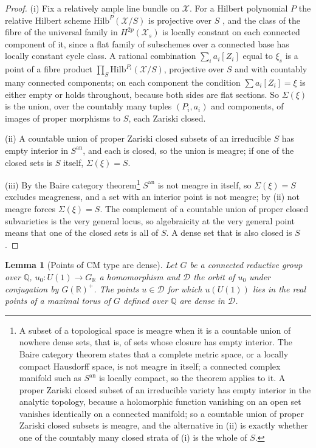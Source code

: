 \documentclass[11pt,reqno]{amsart}
\numberwithin{equation}{section}
\theoremstyle{plain}
\newtheorem{lemma}[theorem]{Lemma}
\theoremstyle{definition}
\newcommand{\QQ}{\mathbb{Q}}
\newcommand{\RR}{\mathbb{R}}
\newcommand{\cD}{\mathcal{D}}
\begin{document}
\begin{proof}
(i) Fix a relatively ample line bundle on $\mathcal{X}$. For a Hilbert polynomial $P$ the relative Hilbert scheme $\mathrm{Hilb}^{P}(\mathcal{X}/S)$ is projective over $S$ \cite{Gro61}, and the class of the fibre of the universal family in $H^{2p}(\mathcal{X}_{s})$ is locally constant on each connected component of it, since a flat family of subschemes over a connected base has locally constant cycle class. A rational combination $\sum_{i}a_{i}[Z_{i}]$ equal to $\xi_{s}$ is a point of a fibre product $\prod_{S}\mathrm{Hilb}^{P_{i}}(\mathcal{X}/S)$, projective over $S$ and with countably many connected components; on each component the condition $\sum a_{i}[Z_{i}]=\xi$ is either empty or holds throughout, because both sides are flat sections. So $\Sigma(\xi)$ is the union, over the countably many tuples $(P_{i},a_{i})$ and components, of images of proper morphisms to $S$, each Zariski closed.

(ii) A countable union of proper Zariski closed subsets of an irreducible $S$ has empty interior in $S^{\mathrm{an}}$, and each is closed, so the union is meagre; if one of the closed sets is $S$ itself, $\Sigma(\xi)=S$.

(iii) By the Baire category theorem\footnote{A subset of a topological space is meagre when it is a countable union of nowhere dense sets, that is, of sets whose closure has empty interior. The Baire category theorem states that a complete metric space, or a locally compact Hausdorff space, is not meagre in itself; a connected complex manifold such as $S^{\mathrm{an}}$ is locally compact, so the theorem applies to it. A proper Zariski closed subset of an irreducible variety has empty interior in the analytic topology, because a holomorphic function vanishing on an open set vanishes identically on a connected manifold; so a countable union of proper Zariski closed subsets is meagre, and the alternative in (ii) is exactly whether one of the countably many closed strata of (i) is the whole of $S$.} $S^{\mathrm{an}}$ is not meagre in itself, so $\Sigma(\xi)=S$ excludes meagreness, and a set with an interior point is not meagre; by (ii) not meagre forces $\Sigma(\xi)=S$. The complement of a countable union of proper closed subvarieties is the very general locus, so algebraicity at the very general point means that one of the closed sets is all of $S$. A dense set that is also closed is $S$.
\end{proof}

\begin{lemma}[Points of CM type are dense]\label{lem:cmdense}
Let $G$ be a connected reductive group over $\QQ$, $u_{0}\colon U(1)\to G_{\RR}$ a homomorphism and $\cD$ the orbit of $u_{0}$ under conjugation by $G(\RR)^{+}$. The points $u\in\cD$ for which $u(U(1))$ lies in the real points of a maximal torus of $G$ defined over $\QQ$ are dense in $\cD$.
\end{lemma}
\end{document}
